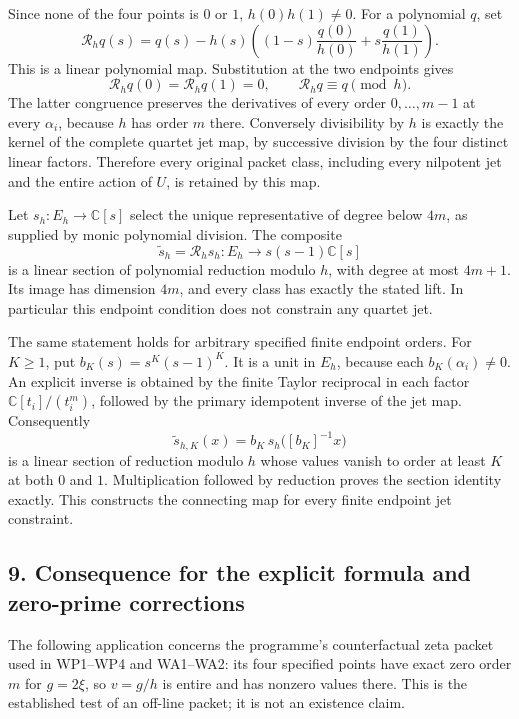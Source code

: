 \documentclass[
  10pt,
  a4paper,
]{article}
\newcounter{none} %
\begin{document}
Since none of the four points is \(0\) or \(1\), \(h(0)h(1)\ne0\). For a
polynomial \(q\), set \[
\boxed{\mathcal R_hq(s)=q(s)-h(s)
\left((1-s)\frac{q(0)}{h(0)}+s\frac{q(1)}{h(1)}\right).}
\tag{ISP34}
\] This is a linear polynomial map. Substitution at the two endpoints
gives \[
\mathcal R_hq(0)=\mathcal R_hq(1)=0,
\qquad\mathcal R_hq\equiv q\pmod h.
\tag{ISP35}
\] The latter congruence preserves the derivatives of every order
\(0,\ldots,m-1\) at every \(\alpha_i\), because \(h\) has order \(m\)
there. Conversely divisibility by \(h\) is exactly the kernel of the
complete quartet jet map, by successive division by the four distinct
linear factors. Therefore every original packet class, including every
nilpotent jet and the entire action of \(U\), is retained by this map.

Let \(s_h:E_h\to\mathbb C[s]\) select the unique representative of
degree below \(4m\), as supplied by monic polynomial division. The
composite \[
\widetilde s_h=\mathcal R_hs_h:
E_h\longrightarrow s(s-1)\mathbb C[s]
\tag{ISP36}
\] is a linear section of polynomial reduction modulo \(h\), with degree
at most \(4m+1\). Its image has dimension \(4m\), and every class has
exactly the stated lift. In particular this endpoint condition does not
constrain any quartet jet.

The same statement holds for arbitrary specified finite endpoint orders.
For \(K\ge1\), put \(b_K(s)=s^K(s-1)^K\). It is a unit in \(E_h\),
because each \(b_K(\alpha_i)\ne0\). An explicit inverse is obtained by
the finite Taylor reciprocal in each factor \(\mathbb C[t_i]/(t_i^m)\),
followed by the primary idempotent inverse of the jet map. Consequently
\[
\widetilde s_{h,K}(x)=b_K\,s_h\bigl([b_K]^{-1}x\bigr)
\tag{ISP37}
\] is a linear section of reduction modulo \(h\) whose values vanish to
order at least \(K\) at both \(0\) and \(1\). Multiplication followed by
reduction proves the section identity exactly. This constructs the
connecting map for every finite endpoint jet constraint.

\subsection{9. Consequence for the explicit formula and zero-prime
corrections}\label{consequence-for-the-explicit-formula-and-zero-prime-corrections}

The following application concerns the programme's counterfactual zeta
packet used in WP1--WP4 and WA1--WA2: its four specified points have
exact zero order \(m\) for \(g=2\xi\), so \(v=g/h\) is entire and has
nonzero values there. This is the established test of an off-line
packet; it is not an existence claim.
\end{document}
